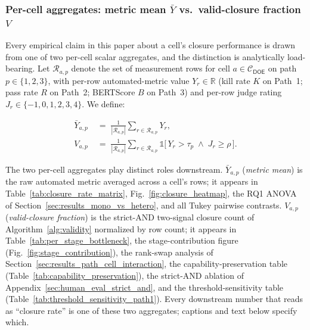 \subsubsection{Per-cell aggregates: metric mean $\bar{Y}$ vs.\ valid-closure fraction $V$}
\label{sec:framework_cell_aggregates}

Every empirical claim in this paper about a cell's closure performance is drawn from one of two per-cell scalar aggregates, and the distinction is analytically load-bearing. Let $\mathcal{R}_{a, p}$ denote the set of measurement rows for cell $a \in \mathcal{C}_{\textsf{DOE}}$ on path $p \in \{1, 2, 3\}$, with per-row automated-metric value $Y_r \in \mathbb{R}$ (kill rate $K$ on Path~1; pass rate $R$ on Path~2; BERTScore $B$ on Path~3) and per-row judge rating $J_r \in \{-1, 0, 1, 2, 3, 4\}$. We define:

\begin{align}
  \bar{Y}_{a, p}
  &\;=\;
  \frac{1}{|\mathcal{R}_{a, p}|}
  \sum_{r \in \mathcal{R}_{a, p}} Y_r,
  \label{eq:metric_mean}
  \\[2pt]
  V_{a, p}
  &\;=\;
  \frac{1}{|\mathcal{R}_{a, p}|}
  \sum_{r \in \mathcal{R}_{a, p}}
    \mathds{1}\!\bigl[\, Y_r > \tau_p \;\wedge\; J_r \geq \rho \,\bigr].
  \label{eq:valid_closure_frac}
\end{align}

The two per-cell aggregates play distinct roles downstream. $\bar{Y}_{a, p}$ (\emph{metric mean}) is the raw automated metric averaged across a cell's rows; it appears in Table~\ref{tab:closure_rate_matrix}, Fig.~\ref{fig:closure_heatmap}, the RQ1 ANOVA of Section~\ref{sec:results_mono_vs_hetero}, and all Tukey pairwise contrasts. $V_{a, p}$ (\emph{valid-closure fraction}) is the strict-AND two-signal closure count of Algorithm~\ref{alg:validity} normalized by row count; it appears in Table~\ref{tab:per_stage_bottleneck}, the stage-contribution figure (Fig.~\ref{fig:stage_contribution}), the rank-swap analysis of Section~\ref{sec:results_path_cell_interaction}, the capability-preservation table (Table~\ref{tab:capability_preservation}), the strict-AND ablation of Appendix~\ref{sec:human_eval_strict_and}, and the threshold-sensitivity table (Table~\ref{tab:threshold_sensitivity_path1}). Every downstream number that reads as ``closure rate'' is one of these two aggregates; captions and text below specify which.

